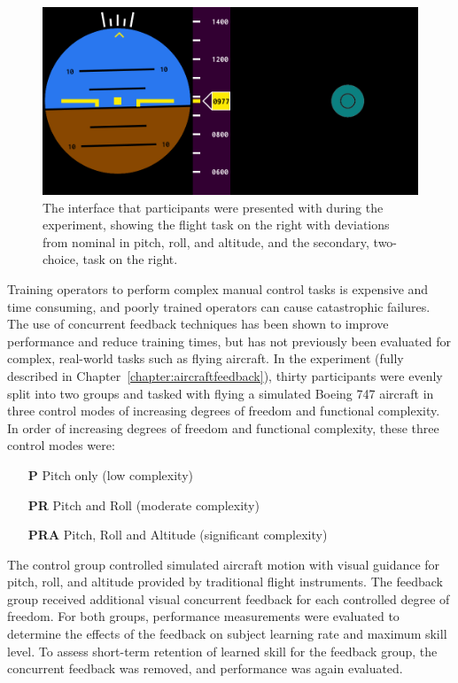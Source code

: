 \begin{figure}[b]
    \centering
    \includegraphics[width=0.8\linewidth]{figures/Aircraft/image1.png}
    \caption[The interface]{The interface that participants were presented with during the experiment, showing the flight task on the right with deviations from nominal in pitch, roll, and altitude, and the secondary, two-choice, task on the right.}
    \label{fig:display}
\end{figure}

Training operators to perform complex manual control tasks is expensive and time consuming, and poorly trained operators can cause catastrophic failures.
The use of concurrent feedback techniques has been shown to improve performance and reduce training times, but has not previously been evaluated for complex, real-world tasks such as flying aircraft.
In the experiment (fully described in Chapter~\ref{chapter:aircraftfeedback}), thirty participants were evenly split into two groups and tasked with flying a simulated Boeing 747 aircraft in three control modes of increasing degrees of freedom and functional complexity.
In order of increasing degrees of freedom and functional complexity, these three control modes were:
\begin{itemize}
    \item[\textbf{P}] Pitch only (low complexity)
    \item[\textbf{PR}] Pitch and Roll (moderate complexity)
    \item[\textbf{PRA}] Pitch, Roll and Altitude (significant complexity)
\end{itemize}
The control group controlled simulated aircraft motion with visual guidance for pitch, roll, and altitude provided by traditional flight instruments.
The feedback group received additional visual concurrent feedback for each controlled degree of freedom.
For both groups, performance measurements were evaluated to determine the effects of the feedback on subject learning rate and maximum skill level.
To assess short-term retention of learned skill for the feedback group, the concurrent feedback was removed, and performance was again evaluated.

